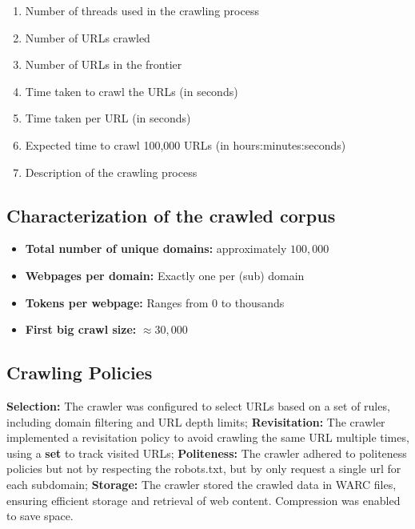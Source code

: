 \begin{enumerate}
  \item Number of threads used in the crawling process
  \item Number of URLs crawled
  \item Number of URLs in the frontier
  \item Time taken to crawl the URLs (in seconds)
  \item Time taken per URL (in seconds)
  \item Expected time to crawl 100,000 URLs (in hours:minutes:seconds)
  \item Description of the crawling process
\end{enumerate}

\subsection{Characterization of the crawled corpus}


\begin{itemize}
  \item \textbf{Total number of unique domains:} approximately $100,000$
  \item \textbf{Webpages per domain:} Exactly one per (sub) domain
  \item \textbf{Tokens per webpage:} Ranges from $0$ to thousands
  \item \textbf{First big crawl size:} $\approx 30,000$
\end{itemize}

\subsection{Crawling Policies}

\textbf{Selection:} The crawler was configured to select URLs based on a set of rules, including domain filtering and URL depth limits;
\textbf{Revisitation:} The crawler implemented a revisitation policy to avoid crawling the same URL multiple times, using a \textbf{set} to track visited URLs;
\textbf{Politeness:} The crawler adhered to politeness policies but not by respecting the robots.txt, but by only request a single url for each subdomain;
\textbf{Storage:} The crawler stored the crawled data in WARC files, ensuring efficient storage and retrieval of web content. Compression was enabled to save space.

